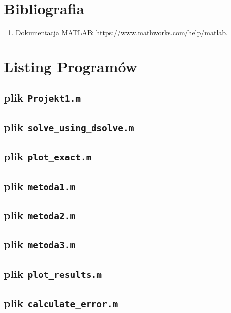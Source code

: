 \documentclass[a4paper, 12pt, twoside, openany]{article}
\begin{document}
    \newpage

    \section*{Bibliografia}
    \begin{enumerate}
        \item Dokumentacja MATLAB: \url{https://www.mathworks.com/help/matlab}.
    \end{enumerate}

    \newpage

    \section*{Listing Programów}

    \subsection*{plik \texttt{Projekt1.m}}
    
    \newpage
    \subsection*{plik \texttt{solve\_using\_dsolve.m}}
    
    \subsection*{plik \texttt{plot\_exact.m}}
    
    \subsection*{plik \texttt{metoda1.m}}
    
    \newpage
    \subsection*{plik \texttt{metoda2.m}}
    
    \subsection*{plik \texttt{metoda3.m}}
    
    \newpage
    \subsection*{plik \texttt{plot\_results.m}}
    
    \subsection*{plik \texttt{calculate\_error.m}}
    
\end{document}

